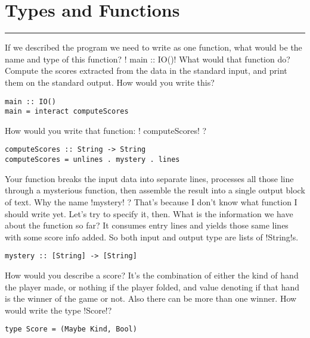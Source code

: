 
 \newpage
\section{Types and Functions} 
\vspace{10cm}
\hrule

\lhQ If we described the program we need to write as one function, what would be the name and type of this function? 
\lhA \il! main :: IO()!
\lhN What would that function do?
\lhA Compute the scores extracted from the data in the standard input, and print them on the standard output.
\lhN How would you write this?
\lhA \begin{lstlisting}[frame=single] 
main :: IO()
main = interact computeScores
\end{lstlisting}
\lhN How would you write that function: \il! computeScores! ?
\lhA \begin{lstlisting}[frame=single] 
computeScores :: String -> String
computeScores = unlines . mystery . lines
\end{lstlisting}
\lhN Your function breaks the input data into separate lines, processes all those line through a mysterious function, then assemble the result into a single output block of text. Why the name \il!mystery! ?  
\lhA That's because I don't know what function I should write yet.
\lhN Let's try to specify it, then. What is the information we have about the function so far?
\lhA It consumes entry lines and yields those same lines with some score info added. So both input and output type are lists of \il!String!s. 
\begin{lstlisting}[frame=single] 
mystery :: [String] -> [String]
\end{lstlisting}
\lhN How would you describe a score?
\lhA It's the combination of either the kind of hand the player made, or nothing if the player folded, and value denoting if that hand is the winner of the game or not. Also there can be more than one winner.
\lhN How would write the type \il!Score!?
\lhA
\begin{lstlisting}[frame=single] 
type Score = (Maybe Kind, Bool)
\end{lstlisting}

\lhend

